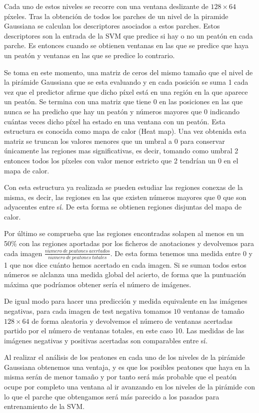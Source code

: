 \documentclass[a4paper,12pt]{article}
\begin{document}
Cada uno de estos niveles se recorre con una ventana deslizante de $128\times 64$ píxeles. Tras la obtención de todos los parches de un nivel de la piramide Gaussiana se calculan los descriptores asociados a estos parches. Estos descriptores son la entrada de la SVM que predice si hay o no un peatón en cada parche. Es entonces cuando se obtienen ventanas en las que se predice que haya un peatón y ventanas en las que se predice lo contrario.

Se toma en este momento, una matriz de ceros del mismo tamaño que el nivel de la pirámide Gaussiana que se esta evaluando y en cada posición se suma 1 cada vez que el predictor afirme que dicho píxel está en una región en la que aparece un peatón. Se termina con una matriz que tiene 0 en las posiciones en las que nunca se ha predicho que hay un peatón y números mayores que 0 indicando cuántas veces dicho píxel ha estado en una ventana con un peatón. Esta estructura es conocida como mapa de calor (Heat map). Una vez obtenida esta matriz se truncan los valores menores que un umbral a 0 para conservar únicamente las regiones mas significativas, es decir, tomando como umbral 2 entonces todos los píxeles con valor menor estricto que 2 tendrían un 0 en el mapa de calor.

Con esta estructura ya realizada se pueden estudiar las regiones conexas de la misma, es decir, las regiones en las que existen números mayores que 0 que son adyacentes entre sí. De esta forma se obtienen regiones disjuntas del mapa de calor.

Por último se comprueba que las regiones encontradas solapen al menos en un 50\% con las regiones aportadas por los ficheros de anotaciones y devolvemos para cada imagen $\frac{n\acute{u}mero \ de \ peatones \ acertados}{n\acute{u}mero \ de \ peatones \ totales}$. De esta forma tenemos una medida entre 0 y 1 que nos dice cuánto hemos acertado en cada imagen. Si se suman todos estos números se alclanza una medida global del acierto, de forma que la puntuación máxima que podríamos obtener sería el número de imágenes.

De igual modo para hacer una predicción y medida equivalente en las imágenes negativas, para cada imagen de test negativa tomamos $10$ ventanas de tamaño $128\times 64$ de forma aleatoria y devolvemos el número de ventanas acertadas partido por el número de ventanas totales, en este caso 10. Las medidas de las imágenes negativas y positivas acertadas son comparables entre sí.

Al realizar el análisis de los peatones en cada uno de los niveles de la pirámide Gaussiana obtenemos una ventaja, y es que los posibles peatones que haya en la misma serán de menor tamaño y por tanto será más probable que el peatón ocupe por completo una ventana al ir avanzando en los niveles de la pirámide con lo que el parche que obtengamos será más parecido a los pasados para entrenamiento de la SVM.
\end{document}
